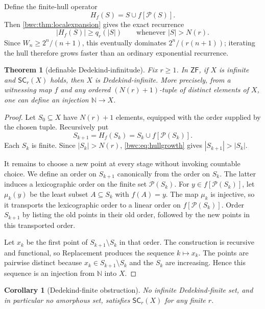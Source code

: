 \documentclass[11pt,letterpaper]{article}
\numberwithin{equation}{section}
\theoremstyle{plain}
\newtheorem{theorem}{Theorem}[section]
\newtheorem{corollary}[corollary]{Corollary}
\theoremstyle{definition}
\theoremstyle{remark}
\newcommand{\Pow}{\mathcal P}
\newcommand{\NN}{\mathbb N}
\newcommand{\SC}{\mathsf{SC}}
\newcommand{\ZF}{\mathsf{ZF}}
\begin{document}
Define the finite-hull operator
\[
             H_f(S)=S\cup f[\Pow(S)].
\]
Then \cref{bwc:thm:localexpansion} gives the exact recurrence
\begin{equation}\label{bwc:eq:hullgrowth}
       |H_f(S)|\geq q_r(|S|)
       \qquad\text{whenever }|S|>N(r).
\end{equation}
Since $W_n\geq2^n/(n+1)$, this eventually dominates
$2^n/(r(n+1))$; iterating the hull therefore grows faster than an ordinary
exponential recurrence.

\begin{theorem}[definable Dedekind-infinitude]\label{bwc:thm:dedekind}
Fix $r\geq1$.  In $\ZF$, if $X$ is infinite and $\SC_r(X)$ holds, then $X$
is Dedekind-infinite.  More precisely, from a witnessing map $f$ and any
ordered $(N(r)+1)$-tuple of distinct elements of $X$, one can define an
injection $\NN\to X$.
\end{theorem}

\begin{proof}
Let $S_0\subseteq X$ have $N(r)+1$ elements, equipped with the order supplied
by the chosen tuple.  Recursively put
\[
       S_{k+1}=H_f(S_k)=S_k\cup f[\Pow(S_k)].
\]
Each $S_k$ is finite.  Since $|S_k|>N(r)$, \cref{bwc:eq:hullgrowth} gives
$|S_{k+1}|>|S_k|$.

It remains to choose a new point at every stage without invoking countable
choice.  We define an order on $S_{k+1}$ canonically from the order on $S_k$.
The latter induces a lexicographic order on the finite set $\Pow(S_k)$.  For
$y\in f[\Pow(S_k)]$, let $\mu_k(y)$ be the least subset $A\subseteq S_k$ with
$f(A)=y$.  The map $\mu_k$ is injective, so it transports the lexicographic
order to a linear order on $f[\Pow(S_k)]$.  Order $S_{k+1}$ by listing the old
points in their old order, followed by the new points in this transported
order.

Let $x_k$ be the first point of $S_{k+1}\setminus S_k$ in that order.  The
construction is recursive and functional, so Replacement produces the
sequence $k\mapsto x_k$.  The points are pairwise distinct because
$x_k\in S_{k+1}\setminus S_k$ and the $S_k$ are increasing.  Hence this
sequence is an injection from $\NN$ into $X$.
\end{proof}

\begin{corollary}[Dedekind-finite obstruction]\label{bwc:cor:dedekindfinite}
No infinite Dedekind-finite set, and in particular no amorphous set, satisfies
$\SC_r(X)$ for any finite $r$.
\end{corollary}
\end{document}
